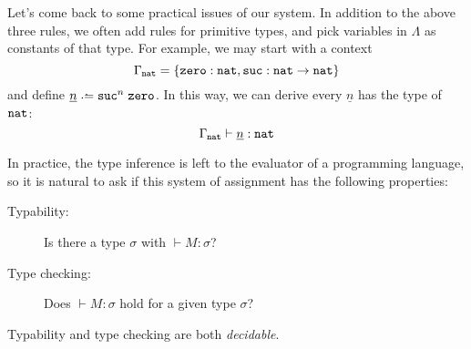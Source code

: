 Let's come back to some practical issues of our system.  In addition to the
above three rules, we often add rules for primitive types, and pick variables in
$\Lambda$ as constants of that type. For example, we may start with a context
\[
  \Gamma_{\mathtt{nat}} = \{\mathtt{zero} : \mathtt{nat}, \mathtt{suc} : \mathtt{nat} \to \mathtt{nat}\}
\]
and define $\underline{n} \defeq \suc^n\;\zero$. In this way, we can derive
every $\underline{n}$ has the type of $\mathtt{nat}$:
\[
  \Gamma_{\mathtt{nat}} \vdash \underline{n} : \mathtt{nat}
\]

In practice, the type inference is left to the evaluator of a programming
language, so it is natural to ask if this system of assignment has the following
properties:
\begin{description}
  \item[Typability:] Is there a type $\sigma$ with $\vdash M : \sigma$? 
  \item[Type checking:] Does $\vdash M : \sigma$ hold for a given type $\sigma$?
  \end{description}
\begin{theorem}
  Typability and type checking are both \emph{decidable}.
\end{theorem}

